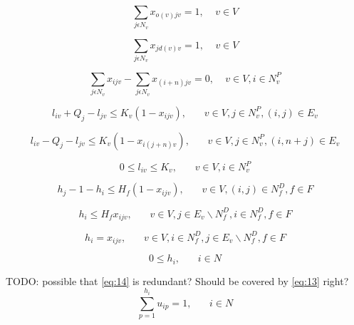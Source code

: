 \documentclass[a4paper,12pt]{article}
\begin{document}
\begin{equation} \label{eq:5}
    \sum_{j\epsilon N_v}x_{o(v)jv} = 1, ~~~~~ v \in V
\end{equation}

\begin{equation} \label{eq:6}
    \sum_{j\epsilon N_v}x_{j d(v)v} = 1, ~~~~~ v \in V
\end{equation}

\begin{equation} \label{eq:7}
    \sum_{j\epsilon N_v}x_{ijv} - \sum_{j\epsilon N_v}x_{(i+n)jv} = 0, ~~~~~ v \in V, i\in N^P_v
\end{equation}

\begin{equation} \label{eq:8}
    l_{iv} + Q_j - l_{jv} \leq K_v(1-x_{ijv}),~~~~~~~~ v \in V,j\in N_v^P,(i,j) \in E_v
\end{equation}

\begin{equation} \label{eq:9}
    l_{iv} - Q_j - l_{jv} \leq K_v(1-x_{i(j+n)v}), ~~~~~~~~ v \in V,j\in N_v^P, (i, n+j)\in E_v
\end{equation}

\begin{equation} \label{eq:10}
0 \leq l_{iv} \leq K_v, ~~~~~~~~ v \in V, i \in N^P_v
\end{equation}

\begin{equation} \label{eq:11}
    h_{j} - 1 - h_{i} \leq H_f(1-x_{ijv}), ~~~~~~~~ v \in V, (i, j)\in N^D_f, f\in F
\end{equation}

\begin{equation} \label{eq:12}
    h_{i} \leq H_fx_{ijv}, ~~~~~~~~ v\in V, j\in E_v\backslash N_f^D, i\in N_f^D, f\in F
\end{equation}

\begin{equation} \label{eq:13}
    h_{i} = x_{ijv}, ~~~~~~~~ v \in V, i \in N^D_f, j \in E_v\backslash N_f^D, f \in F
\end{equation}

\begin{equation} \label{eq:14}
0 \leq h_{i}, ~~~~~~~~ i \in N
\end{equation}

TODO: possible that \ref{eq:14} is redundant? Should be covered by \ref{eq:13} right? 
\begin{equation} \label{eq:15}
    \sum_{p = 1}^{h_i} u_{ip} = 1, ~~~~~~~~ i\in N
\end{equation}
\end{document}
